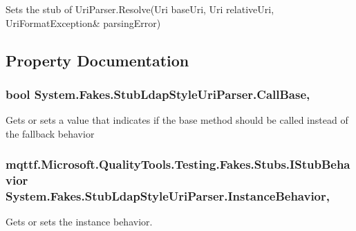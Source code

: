 Sets the stub of Uri\-Parser.\-Resolve(Uri base\-Uri, Uri relative\-Uri, Uri\-Format\-Exception\& parsing\-Error)



\subsection{Property Documentation}
\hypertarget{class_system_1_1_fakes_1_1_stub_ldap_style_uri_parser_adab25010a542c34521f6cec03e16c3d5}{
\subsubsection[{Call\-Base}]{\setlength{\rightskip}{0pt plus 5cm}bool System.\-Fakes.\-Stub\-Ldap\-Style\-Uri\-Parser.\-Call\-Base\hspace{0.3cm}{\ttfamily [get]}, {\ttfamily [set]}}}\label{class_system_1_1_fakes_1_1_stub_ldap_style_uri_parser_adab25010a542c34521f6cec03e16c3d5}


Gets or sets a value that indicates if the base method should be called instead of the fallback behavior

\hypertarget{class_system_1_1_fakes_1_1_stub_ldap_style_uri_parser_a7dd72dee12e64428378308d464a406a6}{
\subsubsection[{Instance\-Behavior}]{\setlength{\rightskip}{0pt plus 5cm}mqttf.\-Microsoft.\-Quality\-Tools.\-Testing.\-Fakes.\-Stubs.\-I\-Stub\-Behavior System.\-Fakes.\-Stub\-Ldap\-Style\-Uri\-Parser.\-Instance\-Behavior\hspace{0.3cm}{\ttfamily [get]}, {\ttfamily [set]}}}\label{class_system_1_1_fakes_1_1_stub_ldap_style_uri_parser_a7dd72dee12e64428378308d464a406a6}


Gets or sets the instance behavior.

